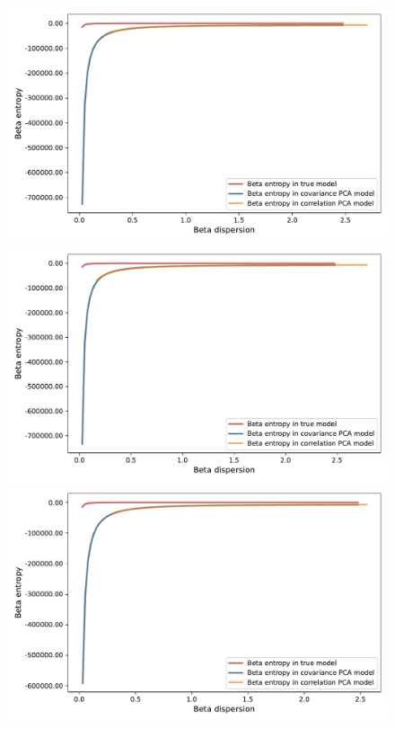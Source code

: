\documentclass[leqno,12pt]{article}
\begin{document}
{\begin{figure}[htp]
\begin{center}
  \includegraphics[scale=0.33]{img/DispersionvsEntropy1factorsN512T256fvol16minsvol10maxsvol40}
  \includegraphics[scale=0.33]{img/DispersionvsEntropy1factorsN512T256fvol25minsvol10maxsvol40}
  \includegraphics[scale=0.33]{img/DispersionvsEntropy1factorsN512T256fvol16minsvol30maxsvol90}

\end{center}
\end{figure}}
\end{document}
